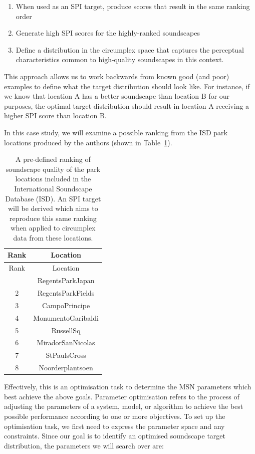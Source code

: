 \documentclass[
  authoryear,
  3p]{elsarticle}
\providecommand{\tightlist}{%
  \setlength{\itemsep}{0pt}\setlength{\parskip}{0pt}}\usepackage{longtable,booktabs,array}
\begin{document}
\begin{enumerate}
\def\labelenumi{\arabic{enumi}.}
\tightlist
\item
  When used as an SPI target, produce scores that result in the same
  ranking order
\item
  Generate high SPI scores for the highly-ranked soundscapes
\item
  Define a distribution in the circumplex space that captures the
  perceptual characteristics common to high-quality soundscapes in this
  context.
\end{enumerate}

This approach allows us to work backwards from known good (and poor)
examples to define what the target distribution should look like. For
instance, if we know that location A has a better soundscape than
location B for our purposes, the optimal target distribution should
result in location A receiving a higher SPI score than location B.

In this case study, we will examine a possible ranking from the ISD park
locations produced by the authors (shown in
Table~\ref{tbl-isd-ranking}).

\begin{longtable}[]{@{}cc@{}}
\caption{A pre-defined ranking of soundscape quality of the park
locations included in the International Soundscape Database (ISD). An
SPI target will be derived which aims to reproduce this same ranking
when applied to circumplex data from these
locations.}\label{tbl-isd-ranking}\tabularnewline
\toprule\noalign{}
Rank & Location \\
\midrule\noalign{}
\endfirsthead
\toprule\noalign{}
Rank & Location \\
\midrule\noalign{}
\endhead
\bottomrule\noalign{}
\endlastfoot
1 & RegentsParkJapan \\
2 & RegentsParkFields \\
3 & CampoPrincipe \\
4 & MonumentoGaribaldi \\
5 & RussellSq \\
6 & MiradorSanNicolas \\
7 & StPaulsCross \\
8 & Noorderplantsoen \\
\end{longtable}

Effectively, this is an optimisation task to determine the MSN
parameters which best achieve the above goals. Parameter optimisation
refers to the process of adjusting the parameters of a system, model, or
algorithm to achieve the best possible performance according to one or
more objectives. To set up the optimisation task, we first need to
express the parameter space and any constraints. Since our goal is to
identify an optimised soundscape target distribution, the parameters we
will search over are:
\end{document}
